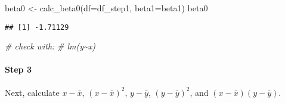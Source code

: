 \documentclass[
]{article}
\newenvironment{Shaded}{\begin{snugshade}}{\end{snugshade}}
\newcommand{\AttributeTok}[1]{\textcolor[rgb]{0.77,0.63,0.00}{#1}}
\newcommand{\CommentTok}[1]{\textcolor[rgb]{0.56,0.35,0.01}{\textit{#1}}}
\newcommand{\FunctionTok}[1]{\textcolor[rgb]{0.00,0.00,0.00}{#1}}
\newcommand{\NormalTok}[1]{#1}
\newcommand{\OtherTok}[1]{\textcolor[rgb]{0.56,0.35,0.01}{#1}}
\begin{document}
\begin{Shaded}
\begin{Highlighting}[]
\NormalTok{beta0 }\OtherTok{\textless{}{-}} \FunctionTok{calc\_beta0}\NormalTok{(}\AttributeTok{df=}\NormalTok{df\_step1, }\AttributeTok{beta1=}\NormalTok{beta1)}
\NormalTok{beta0}
\end{Highlighting}
\end{Shaded}

\begin{verbatim}
## [1] -1.71129
\end{verbatim}

\begin{Shaded}
\begin{Highlighting}[]
\CommentTok{\# check with:}
\CommentTok{\# lm(y\textasciitilde{}x)}
\end{Highlighting}
\end{Shaded}

\hypertarget{step-3}{%
\paragraph{Step 3}\label{step-3}}

Next, calculate \(x-\bar x\), \((x- \bar x)^2\), \(y-\bar y\),
\((y-\bar y)^2\), and \((x-\bar x)(y-\bar y)\).
\end{document}
